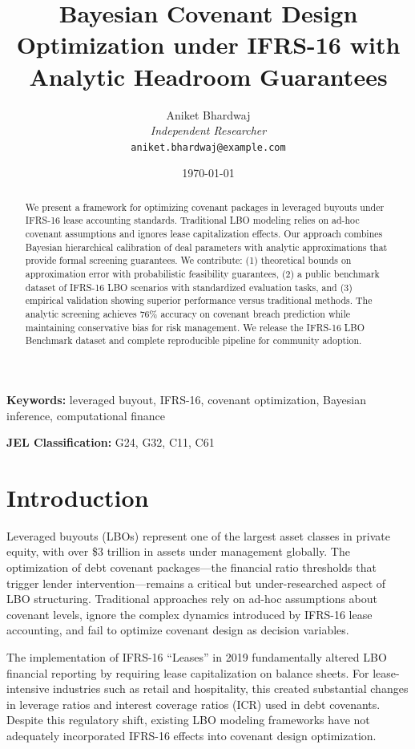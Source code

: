 \documentclass[11pt,a4paper]{article}
\title{Bayesian Covenant Design Optimization under IFRS-16 with Analytic Headroom Guarantees}
\author{
Aniket Bhardwaj\\
\textit{Independent Researcher}\\
\texttt{aniket.bhardwaj@example.com}
}
\date{\today}
\begin{document}
\maketitle

\begin{abstract}
We present a framework for optimizing covenant packages in leveraged buyouts under IFRS-16 lease accounting standards. Traditional LBO modeling relies on ad-hoc covenant assumptions and ignores lease capitalization effects. Our approach combines Bayesian hierarchical calibration of deal parameters with analytic approximations that provide formal screening guarantees. We contribute: (1) theoretical bounds on approximation error with probabilistic feasibility guarantees, (2) a public benchmark dataset of IFRS-16 LBO scenarios with standardized evaluation tasks, and (3) empirical validation showing superior performance versus traditional methods. The analytic screening achieves 76\% accuracy on covenant breach prediction while maintaining conservative bias for risk management. We release the IFRS-16 LBO Benchmark dataset and complete reproducible pipeline for community adoption.
\end{abstract}

\textbf{Keywords:} leveraged buyout, IFRS-16, covenant optimization, Bayesian inference, computational finance

\textbf{JEL Classification:} G24, G32, C11, C61

\section{Introduction}

Leveraged buyouts (LBOs) represent one of the largest asset classes in private equity, with over \$3 trillion in assets under management globally. The optimization of debt covenant packages---the financial ratio thresholds that trigger lender intervention---remains a critical but under-researched aspect of LBO structuring. Traditional approaches rely on ad-hoc assumptions about covenant levels, ignore the complex dynamics introduced by IFRS-16 lease accounting, and fail to optimize covenant design as decision variables.

The implementation of IFRS-16 ``Leases'' in 2019 fundamentally altered LBO financial reporting by requiring lease capitalization on balance sheets. For lease-intensive industries such as retail and hospitality, this created substantial changes in leverage ratios and interest coverage ratios (ICR) used in debt covenants. Despite this regulatory shift, existing LBO modeling frameworks have not adequately incorporated IFRS-16 effects into covenant design optimization.
\end{document}
